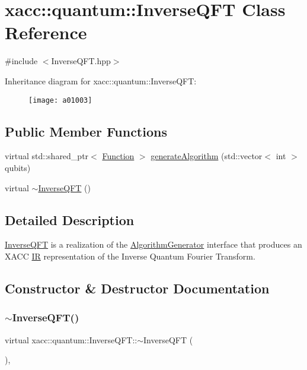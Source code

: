 \hypertarget{a01003}{}\section{xacc\+:\+:quantum\+:\+:Inverse\+Q\+FT Class Reference}
\label{a01003}


{\ttfamily \#include $<$Inverse\+Q\+F\+T.\+hpp$>$}

Inheritance diagram for xacc\+:\+:quantum\+:\+:Inverse\+Q\+FT\+:\begin{figure}[H]
\begin{center}
\leavevmode
\texttt{[image: a01003]}
\end{center}
\end{figure}
\subsection*{Public Member Functions}
\begin{DoxyCompactItemize}
\item 
virtual std\+::shared\+\_\+ptr$<$ \hyperlink{a01151}{Function} $>$ \hyperlink{a01003_af42e466bf02dbd60670d20aa55cfb08d}{generate\+Algorithm} (std\+::vector$<$ int $>$ qubits)
\item 
virtual \hyperlink{a01003_a731c10d28046424be74e4c0daa31d016}{$\sim$\+Inverse\+Q\+FT} ()
\end{DoxyCompactItemize}


\subsection{Detailed Description}
\hyperlink{a01003}{Inverse\+Q\+FT} is a realization of the \hyperlink{a01143}{Algorithm\+Generator} interface that produces an X\+A\+CC \hyperlink{a01175}{IR} representation of the Inverse Quantum Fourier Transform. 

\subsection{Constructor \& Destructor Documentation}
\mbox{\label{a01003_a731c10d28046424be74e4c0daa31d016}} 
\subsubsection{\texorpdfstring{$\sim$\+Inverse\+Q\+F\+T()}{~InverseQFT()}}
{\footnotesize\ttfamily virtual xacc\+::quantum\+::\+Inverse\+Q\+F\+T\+::$\sim$\+Inverse\+Q\+FT (\begin{DoxyParamCaption}{ }\end{DoxyParamCaption})\hspace{0.3cm}{\ttfamily [inline]}, {\ttfamily [virtual]}}

